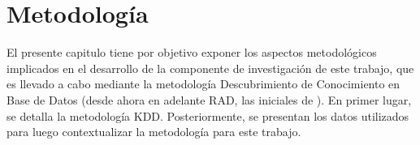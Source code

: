 
\chapter{Metodología}
\label{chp:metodologia}
El presente capitulo tiene por objetivo exponer los aspectos metodológicos implicados en el desarrollo de la componente de investigación de este trabajo, que es llevado a cabo mediante la metodología Descubrimiento de Conocimiento en Base de Datos (desde ahora en adelante RAD, las iniciales de ). En primer lugar, se detalla la metodología KDD. Posteriormente, se presentan los datos utilizados para luego contextualizar la metodología para este trabajo. 


%
%
%